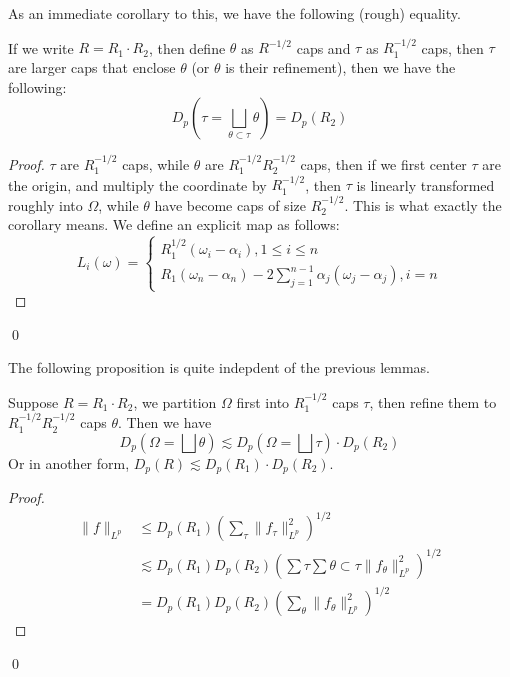 As an immediate corollary to this, we have the following (rough) equality.
\begin{corollary}
    If we write $R=R_1\cdot R_2$, then define $\theta$ as $R^{-1/2}$ caps and $\tau$ as $R_1^{-1/2}$ caps, then $\tau$ are larger caps that enclose $\theta$ (or $\theta$ is their refinement), then we have the following:
    \begin{equation*}
        D_p(\tau=\bigsqcup_{\theta\subset\tau}\theta)=D_p(R_2)
    \end{equation*}
\end{corollary}
\begin{proof}
    $\tau$ are $R_1^{-1/2}$ caps, while $\theta$ are $R_1^{-1/2}R_2^{-1/2}$ caps, then if we first center $\tau$ are the origin, and multiply the coordinate by $R_1^{-1/2}$, then $\tau$ is linearly transformed roughly into $\Omega$, while $\theta$ have become caps of size $R_2^{-1/2}$. This is what exactly the corollary means. We define an explicit map as follows:
    \begin{equation*}
        L_i(\omega)=\begin{cases}
            R_1^{1/2}(\omega_i-\alpha_i), 1\leq i\leq n\\
            R_1(\omega_n-\alpha_n)-2\sum_{j=1}^{n-1}\alpha_j(\omega_j-\alpha_j), i=n
        \end{cases}
    \end{equation*}
\end{proof}
\qed

The following proposition is quite indepdent of the previous lemmas.
\begin{lemma}
    Suppose $R=R_1\cdot R_2$, we partition $\Omega$ first into $R_1^{-1/2}$ caps $\tau$, then refine them to $R_1^{-1/2}R_2^{-1/2}$ caps $\theta$. Then we have
    \begin{equation*}
        D_p(\Omega=\bigsqcup\theta)\lesssim D_p(\Omega=\bigsqcup\tau)\cdot D_p(R_2)
    \end{equation*}
    Or in another form, $D_p(R)\lesssim D_p(R_1)\cdot D_p(R_2)$.
\end{lemma}
\begin{proof}
    \begin{align*}
        \|f\|_{L^p}&\leq D_p(R_1)\left(\sum_\tau\|f_\tau\|_{L^p}^2 \right)^{1/2}\\
        &\lesssim D_p(R_1)D_p(R_2)\left(\sum\tau\sum{\theta\subset\tau}\|f_\theta\|_{L^p}^2 \right)^{1/2}\\
        &=D_p(R_1)D_p(R_2)\left(\sum_\theta\|f_\theta\|_{L^p}^2 \right)^{1/2}
    \end{align*}
\end{proof}
\qed

